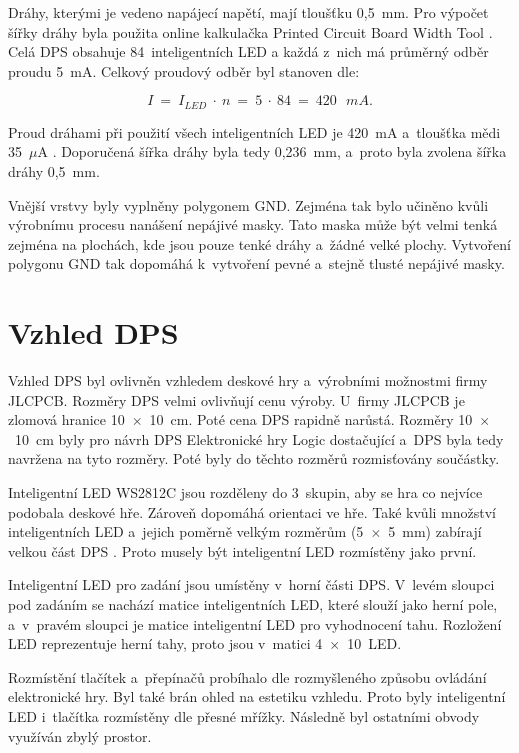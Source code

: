  Dráhy, kterými je vedeno napájecí napětí, mají tloušťku 0,5~mm. Pro výpočet šířky dráhy byla použita online kalkulačka Printed
  Circuit Board Width Tool \cite{Kalkulacka_drahy_DPS}. 
  Celá DPS obsahuje 84~inteligentních LED a každá z~nich má průměrný odběr proudu 5~mA. Celkový proudový odběr byl stanoven dle:

  \begin{equation} 
    I~=~I_{LED}~\cdot~n~=~5~\cdot~84~=~420~\:~mA.
  \end{equation}

  Proud dráhami při použití všech inteligentních LED je 420~mA a~tloušťka 
  mědi 35~$\mu$A \cite{JLCPCB_Capabilities}. Doporučená šířka dráhy byla tedy 0,236~mm, a~proto byla zvolena šířka dráhy 0,5~mm.

  Vnější vrstvy byly vyplněny polygonem GND. Zejména tak bylo učiněno kvůli výrobnímu procesu nanášení nepájivé masky. Tato maska
  může být velmi tenká zejména na plochách, kde jsou pouze tenké dráhy a~žádné velké plochy. Vytvoření polygonu GND tak dopomáhá
  k~vytvoření pevné a~stejně tlusté nepájivé masky. 

  \newpage
  \section{Vzhled DPS}
  Vzhled DPS byl ovlivněn vzhledem deskové hry a~výrobními možnostmi firmy JLCPCB. Rozměry DPS velmi ovlivňují cenu výroby. U~firmy 
  JLCPCB je zlomová hranice 10~$\times$~10~cm. Poté cena DPS rapidně narůstá. Rozměry 10~$\times$~10~cm byly pro návrh DPS Elektronické 
  hry Logic dostačující a~DPS byla tedy navržena na tyto rozměry. Poté byly do těchto rozměrů rozmisťovány součástky. 

  Inteligentní LED WS2812C jsou rozděleny do 3~skupin, aby se hra co nejvíce podobala deskové hře. Zároveň dopomáhá orientaci ve hře.
  Také kvůli množství inteligentních LED a~jejich poměrně velkým rozměrům (5~$\times$~5~mm) zabírají velkou část DPS 
  \cite{WS2812C_datasheet}. Proto musely být inteligentní LED rozmístěny jako první.

  Inteligentní LED pro zadání jsou umístěny v~horní části DPS. V~levém sloupci pod zadáním se nachází matice inteligentních LED, které slouží jako herní 
  pole, a~v~pravém sloupci je matice inteligentní LED pro vyhodnocení tahu. Rozložení LED reprezentuje herní tahy, proto jsou v~matici 4~$\times$~10~LED.
  
  Rozmístění tlačítek a~přepínačů probíhalo dle 
  rozmyšleného způsobu ovládání elektronické hry. Byl také brán ohled na estetiku vzhledu. Proto byly inteligentní LED i~tlačítka 
  rozmístěny dle přesné mřížky. Následně byl ostatními obvody využíván zbylý prostor. 

